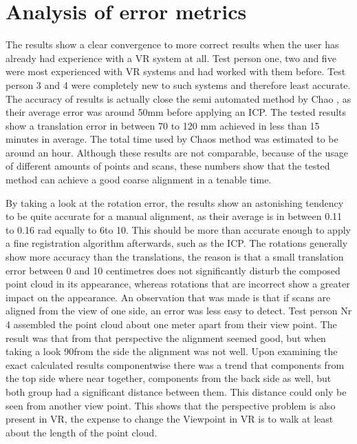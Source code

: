 \documentclass[hyperref,english,bachelorofscience,bibnum,twoside]{cgvpub}
\begin{document}
\section{Analysis of error metrics}

The results show a clear convergence to more correct results when the user has already had experience with a VR system at all. Test person one, two and five were most experienced with VR systems and had worked with them before. Test person 3 and 4 were completely new to such systems and therefore least accurate. The accuracy of results is actually close the semi automated method by Chao \cite{Chao}, as their average error was around 50mm before applying an ICP. The tested results show a translation error in between 70 to 120 mm achieved in less than 15 minutes in average. The total time used by Chaos method was estimated to be around an hour\cite{Chao}. Although these results are not comparable, because of the usage of different amounts of points and scans, these numbers show that the tested method can achieve a good coarse alignment in a tenable time.

By taking a look at the rotation error, the results show an astonishing tendency to be quite accurate for a manual alignment, as their average is in between 0.11 to 0.16 rad equally to 6\textdegree to 10\textdegree. This should be more than accurate enough to apply a fine registration algorithm afterwards, such as the ICP. The rotations generally show more accuracy than the translations, the reason is that a small translation error between 0 and 10 centimetres does not significantly disturb the composed point cloud in its appearance, whereas rotations that are incorrect show a greater impact on the appearance. An observation that was made is that if scans are aligned from the view of one side, an error was less easy to detect. Test person Nr 4 assembled the point cloud about one meter apart from their view point. The result was that from that perspective the alignment seemed good, but when taking a look 90\textdegree from the side the alignment was not well. Upon examining the exact calculated results componentwise there was a trend that components from the top side where near together, components from the back side as well, but both group had a significant distance between them. This distance could only be seen from another view point. This shows that the perspective problem is also present in VR, the expense to change the Viewpoint in VR is to walk at least about the length of the point cloud.
\end{document}
